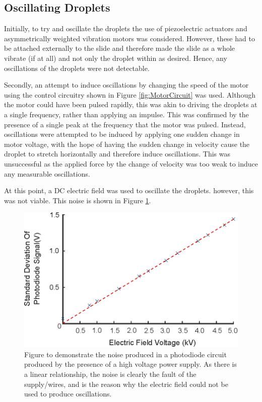 \documentclass{physics_article_B}
\begin{document}
        
    \subsection{Oscillating Droplets\label{sect:results:oscillation}}
      
        Initially, to try and oscillate the droplets the use of piezoelectric actuators and asymmetrically weighted vibration motors was considered. However, these had to be attached externally to the slide and therefore made the slide as a whole vibrate (if at all) and not only the droplet within as desired. Hence, any oscillations of the droplets were not detectable.
        
        Secondly, an attempt to induce oscillations by changing the speed of the motor using the control circuitry shown in Figure \ref{fig:MotorCircuit} was used. Although the motor could have been pulsed rapidly, this was akin to driving the droplets at a single frequency, rather than applying an impulse. This was confirmed by the presence of a single peak at the frequency that the motor was pulsed. Instead, oscillations were attempted to be induced by applying one sudden change in motor voltage, with the hope of having the sudden change in velocity cause the droplet to stretch horizontally and therefore induce oscillations. This was unsuccessful as the applied force by the change of velocity was too weak to induce any measurable oscillations.
        
        At this point, a DC electric field was used to oscillate the droplets. however, this was not viable. This noise is shown in Figure \ref{fig:control}. 
        
        \begin{figure}[H]
            \centering
            \includegraphics{Figures/ElecFieldNoise.eps}
            \caption{Figure to demonstrate the noise produced in a photodiode circuit produced by the presence of a high voltage power supply. As there is a linear relationship, the noise is clearly the fault of the supply/wires, and is the reason why the electric field could not be used to produce oscillations.} 	
            \label{fig:control}
        \end{figure} 
        
\end{document}
